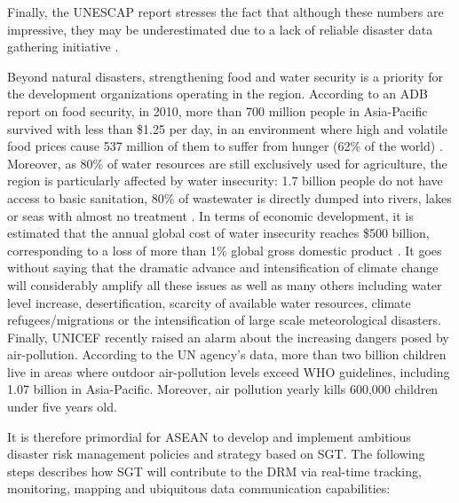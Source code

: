 Finally, the UNESCAP report stresses the fact that although these numbers are impressive, they may be underestimated due to a lack of reliable  disaster data gathering initiative \cite{APdisaster2015}.

\vspace{0.4 cm}

Beyond natural disasters, strengthening food and water security is a priority for the development organizations operating in the region. According to an ADB report on food security, in 2010, more than 700 million people in Asia-Pacific survived with less than \$1.25 per day, in an environment where high and volatile food prices cause 537 million of them to suffer from hunger (62\% of the world) \cite{ADBfood}. Moreover, as 80\% of water resources are still exclusively used for agriculture, the region is particularly affected by water insecurity: 1.7 billion people do not have access to basic sanitation, 80\% of wastewater is directly dumped into rivers, lakes or seas with almost no treatment \cite{AWDO2016}. In terms of economic development, it is estimated that the annual global cost of water insecurity reaches \$500 billion, corresponding to a loss of more than 1\% global gross domestic product \cite{sadoff}. It goes without saying that the dramatic advance and intensification of climate change will considerably amplify all these issues as well as many others including water level increase, desertification, scarcity of available water resources, climate refugees/migrations or the intensification of large scale meteorological disasters. Finally, UNICEF recently raised an alarm about the increasing dangers posed by air-pollution. According to the UN agency's data, more than two billion children live in areas where outdoor air-pollution levels exceed WHO guidelines, including 1.07 billion in Asia-Pacific. Moreover, air pollution yearly kills 600,000 children under five years old.

\vspace{0.4 cm}

It is therefore primordial for ASEAN to develop and implement ambitious disaster risk management policies and strategy based on SGT. The following steps describes how SGT will contribute to the DRM via real-time tracking, monitoring, mapping and ubiquitous data communication capabilities:

